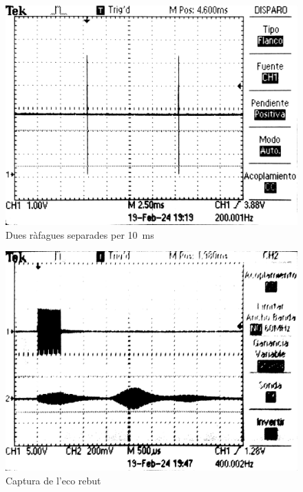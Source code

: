 \documentclass[catalan, a4paper, nobib]{tufte-handout}
\begin{document}
\begin{figure}
  \includegraphics[width=\linewidth]{foto3.png}
  \caption{Dues ràfagues separades per \qty{10}{\milli\second}}
  \label{fig:foto3}
\end{figure}

\begin{figure}
  \includegraphics[width=\linewidth]{foto4.png}
  \caption{Captura de l'eco rebut}
  \label{fig:foto4}
\end{figure}
\end{document}

